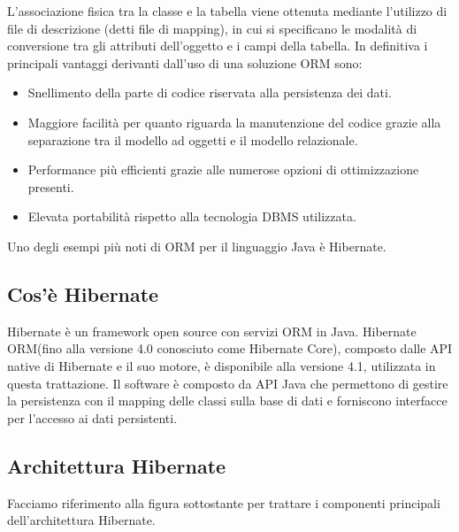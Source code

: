 L'associazione fisica tra la classe e la tabella viene ottenuta mediante l'utilizzo di file di descrizione (detti file di mapping), in cui si specificano le modalit\`a di conversione tra gli attributi dell'oggetto e i campi della tabella. In definitiva i principali vantaggi derivanti dall'uso di una soluzione ORM sono:
\begin{itemize}
\item Snellimento della parte di codice riservata alla persistenza dei dati.
\item Maggiore facilit\`a per quanto riguarda la manutenzione del codice grazie alla separazione tra il modello ad oggetti e il modello relazionale.
\item Performance pi\`u efficienti grazie alle numerose opzioni di ottimizzazione presenti.
\item Elevata portabilit\`a rispetto alla tecnologia DBMS utilizzata.
\end{itemize}

Uno degli esempi pi\`u noti di ORM per il linguaggio Java \`e Hibernate.
\subsection{Cos'\`e Hibernate}
Hibernate \`e un framework open source
con servizi ORM in Java. Hibernate ORM(fino alla versione 4.0 conosciuto come Hibernate Core), composto dalle API native di Hibernate e il suo motore, \`e disponibile alla versione 4.1, utilizzata in questa trattazione.
Il software \`e composto da API Java che permettono di gestire la persistenza con il mapping delle classi sulla base di dati e forniscono interfacce per l'accesso ai dati persistenti.
\subsection{Architettura Hibernate}
Facciamo riferimento alla figura sottostante per  trattare i componenti principali dell'architettura Hibernate.

